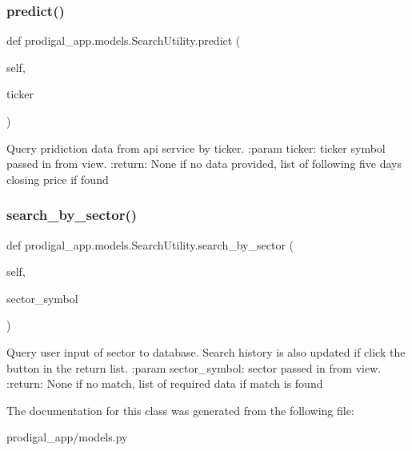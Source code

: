 \subsubsection{\texorpdfstring{predict()}{predict()}}
{\footnotesize\ttfamily def prodigal\+\_\+app.\+models.\+Search\+Utility.\+predict (\begin{DoxyParamCaption}\item[{}]{self,  }\item[{}]{ticker }\end{DoxyParamCaption})}

\begin{DoxyVerb}Query pridiction data from api service by ticker.
:param ticker: ticker symbol passed in from view.
:return: None if no data provided,
list of following five days closing price if found
\end{DoxyVerb}
 \mbox{\label{classprodigal__app_1_1models_1_1_search_utility_af846eae6287a4470507a1646d9924167}} 
\subsubsection{\texorpdfstring{search\+\_\+by\+\_\+sector()}{search\_by\_sector()}}
{\footnotesize\ttfamily def prodigal\+\_\+app.\+models.\+Search\+Utility.\+search\+\_\+by\+\_\+sector (\begin{DoxyParamCaption}\item[{}]{self,  }\item[{}]{sector\+\_\+symbol }\end{DoxyParamCaption})}

\begin{DoxyVerb}Query user input of sector to database.
Search history is also updated if click the button in the return list.
:param sector_symbol: sector passed in from view.
:return: None if no match, list of required data if match is found
\end{DoxyVerb}
 

The documentation for this class was generated from the following file\+:\begin{DoxyCompactItemize}
\item 
prodigal\+\_\+app/models.\+py\end{DoxyCompactItemize}
